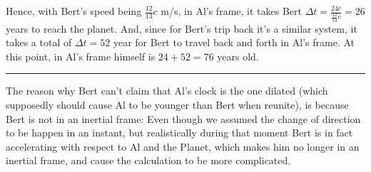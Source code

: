 \documentclass{article}
\begin{document}
Hence, with Bert's speed being $\frac{12}{13}c$ m/s, in Al's frame, it takes Bert $\Delta t = \frac{24c}{\frac{12}{13}c} = 26$ years to reach the planet. And, since for Bert's trip back it's a similar system, it takes a total of $\Delta t=52$ year for Bert to travel back and forth in Al's frame. At this point, in Al's frame himself is $24 + 52 = 76$ years old.

\rule{15.6cm}{0.1mm}

The reason why Bert can't claim that Al's clock is the one dilated (which supposedly should cause Al to be younger than Bert when reunite), is because Bert is not in an inertial frame: Even though we assumed the change of direction to be happen in an instant, but realistically during that moment Bert is in fact accelerating with respect to Al and the Planet, which makes him no longer in an inertial frame, and cause the calculation to be more complicated.
\end{document}
